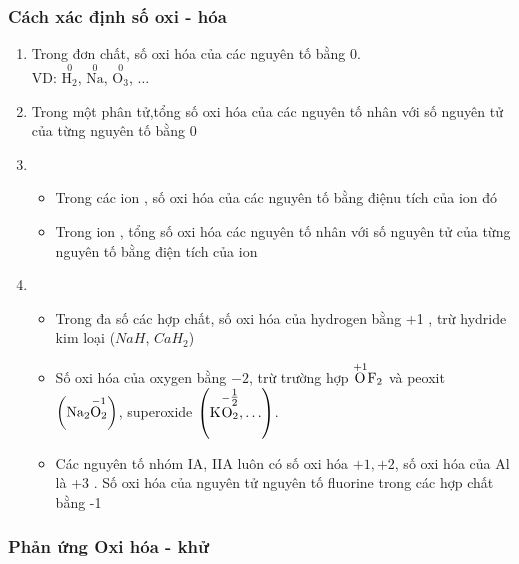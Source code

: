 \begin{body}
	\subsubsection{Cách xác định số oxi - hóa}
	\begin{enumerate}
		\item {}
		Trong đơn chất, số oxi hóa của các nguyên tố bằng 0.\\
		VD: $\overset{0}{\mathrm{H}_{2}}$, $\overset{0}{\mathrm{Na}}$, $\overset{0}{\mathrm{O}_{3}}$, $\ldots$
		\item {}
		Trong một phân tử,tổng số oxi hóa  của các nguyên tố nhân với số nguyên tử của từng nguyên tố bằng 0\\
		\item {} 
		\begin{itemize}
			\item Trong các ion , số oxi hóa của các nguyên tố bằng điệnu tích của ion đó\\
			\item Trong ion , tổng số oxi hóa các nguyên tố nhân với số nguyên tử của từng nguyên tố bằng điện tích của ion
		\end{itemize}
		\item {} \\
		\begin{itemize}
			\item Trong đa số các hợp chất, số oxi hóa của hydrogen bằng +1 , trừ hydride kim loại ($NaH$, $CaH_2$)\\
			\item Số oxi hóa của oxygen bằng $-\mathrm{2}$, trừ trường hợp $\overset{+1}{\mathrm{O}_{}}\overset{\vphantom{-1}}{\mathrm{F}_{2}}$ và peoxit $\left(\overset{\vphantom{+1}}{\mathrm{Na}_{2}}\overset{-1}{\mathrm{O}_{2}}\right)$, superoxide $\left(\overset{\vphantom{+1}}{\mathrm{K}_{}}\overset{-\tfrac{1}{2}}{\mathrm{O}_{2}}, \ldots\right)$.\\
			\item Các nguyên tố nhóm IA, IIA luôn có số oxi hóa $+1,+2$, số oxi hóa của $\mathrm{Al}$ là +3 . Số oxi hóa của nguyên tử nguyên tố fluorine trong các hợp chất bằng -1
		\end{itemize}
	\end{enumerate}
	\subsubsection{Phản ứng Oxi hóa - khử}

\end{body}
